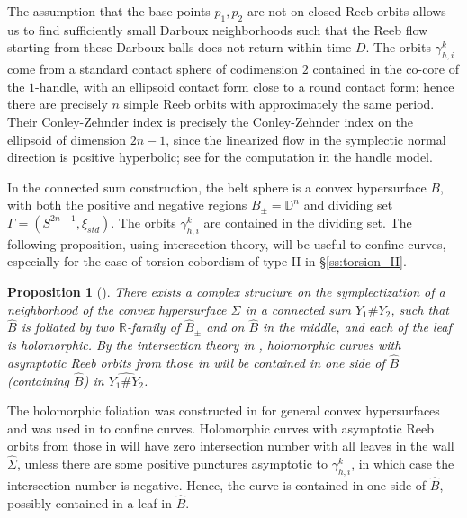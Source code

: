 \documentclass[11pt]{amsart}
\numberwithin{equation}{section}
\newtheorem{proposition}[theorem]{\textbf{Proposition}}
\def\R{\mathbb{R}}
\def\D{{\mathbb D}}
\begin{document}
The assumption that the base points $p_1,p_2$ are not on closed Reeb orbits allows us to find sufficiently small Darboux neighborhoods such that the Reeb flow starting from these Darboux balls does not return within time $D$. The orbits $\gamma_{h,i}^k$ come from a standard contact sphere of codimension $2$ contained in the co-core of the $1$-handle, with an ellipsoid contact form close to a round contact form; hence there are precisely $n$ simple Reeb orbits with approximately the same period. Their Conley-Zehnder index is precisely the Conley-Zehnder index on the ellipsoid of dimension $2n-1$, since the linearized flow in the symplectic normal direction is positive hyperbolic; see \cite[Lemma 3.1, Theorem 3.1]{Yau} for the computation in the handle model. 


In the connected sum construction, the belt sphere is a convex hypersurface $B$, with both the positive and negative regions $B_{\pm}=\D^n$ and dividing set $\Gamma=(S^{2n-1},\xi_{std})$. The orbits $\gamma_{h,i}^k$ are contained in the dividing set. The following proposition, using intersection theory, will be useful to confine curves, especially for the case of torsion cobordism of type II in \S \ref{ss:torsion_II}.
\begin{proposition}[\cite{arXiv:2307.09068,connected_sum}]\label{prop:wall}
    There exists a complex structure on the symplectization of a neighborhood of the convex hypersurface $\Sigma$ in a connected sum $Y_1\#Y_2$, such that $\widehat{B}$ is foliated by two $\R$-family of $\widehat{B}_{\pm}$ and on $\widehat{B}$ in the middle, and each of the leaf is holomorphic. By the intersection theory in \cite{arXiv:2506.06807}, holomorphic curves with asymptotic Reeb orbits from those in  will be contained in one side of $\widehat{B}$ (containing $\widehat{B}$) in $\widehat{Y_1\#Y_2}$.
\end{proposition}
The holomorphic foliation was constructed in \cite{zbMATH07699409} for general convex hypersurfaces and was used in \cite{connected_sum} to confine curves. Holomorphic curves with asymptotic Reeb orbits from those in  will have zero intersection number \cite[\S 2]{arXiv:2506.06807} with all leaves in the wall $\widehat{\Sigma}$, unless there are some positive punctures asymptotic to $\gamma_{h,i}^k$, in which case the intersection number is negative. Hence, the curve is contained in one side of $\widehat{B}$, possibly contained in a leaf in $\widehat{B}$.
\end{document}
